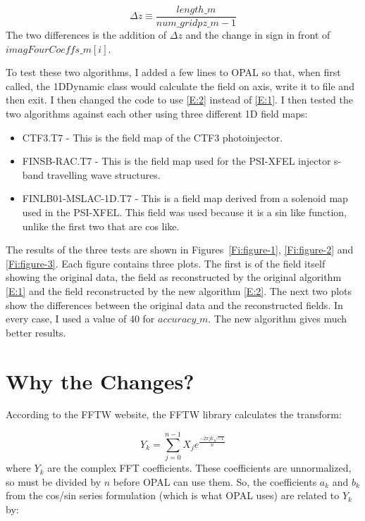 \documentclass{report}
\begin{document}
\begin{equation*}
  \Delta z \equiv \frac{length\_m}{num\_gridpz\_m - 1}
\end{equation*}
The two differences is the addition of $\Delta z$ and the change in sign in front of $imagFourCoeffs\_m[i]$.

To test these two algorithms, I added a few lines to OPAL so that, when first called, the 1DDynamic class would calculate the
field on axis, write it to file and then exit. I then changed the code to use \eqref{E:2} instead of \eqref{E:1}. I then tested
the two algorithms against each other using three different 1D field maps:

\begin{itemize}
\item CTF3.T7 - This is the field map of the CTF3 photoinjector.
\item FINSB-RAC.T7 - This is the field map used for the PSI-XFEL injector s-band travelling wave structures.
\item FINLB01-MSLAC-1D.T7 - This is a field map derived from a solenoid map used in the PSI-XFEL. This field was used because
  it is a sin like function, unlike the first two that are cos like.
\end{itemize}

The results of the three tests are shown in Figures~\ref{Fi:figure-1}, \ref{Fi:figure-2} and \ref{Fi:figure-3}. Each figure
contains three plots. The first is of the field itself showing the original data, the field as reconstructed by the original
algorithm \eqref{E:1} and the field reconstructed by the new algorithm \eqref{E:2}. The next two plots show the differences
between the original data and the reconstructed fields. In every case, I used a value of 40 for $accuracy\_m$. The new
algorithm gives much better results.

\section{Why the Changes?}
According to the FFTW website, the FFTW library calculates the transform:

\begin{equation}\label{E:3}
  Y_{k} = \sum_{j = 0}^{n - 1}X_{j}e^{\frac{-2 \pi j k \sqrt{-1}}{n}}
\end{equation}
where $Y_{k}$ are the complex FFT coefficients. These coefficients are unnormalized, so must be divided by $n$ before OPAL
can use them. So, the coefficients $a_{k}$ and $b_{k}$ from the cos/sin series formulation (which is what OPAL uses) are related
to $Y_{k}$ by:
\end{document}
